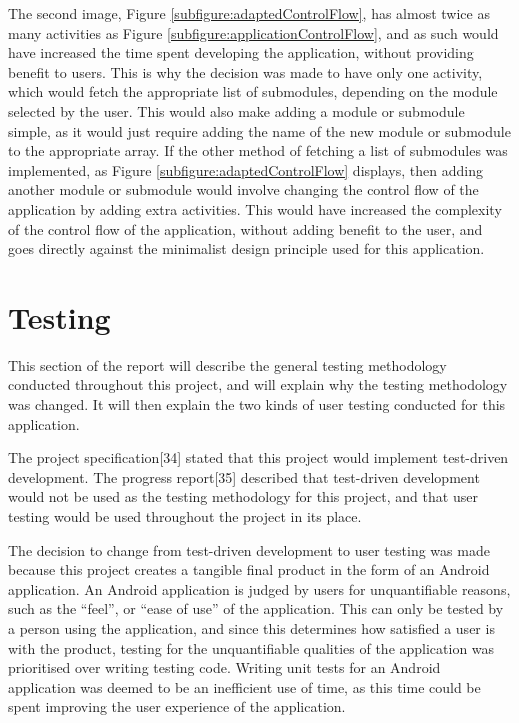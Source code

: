 \documentclass{article}
\begin{document}
The second image, Figure \ref{subfigure:adaptedControlFlow}, has almost twice as many activities as Figure \ref{subfigure:applicationControlFlow}, and as such would have increased the time spent developing the application, without providing benefit to users. This is why the decision was made to have only one activity, which would fetch the appropriate list of submodules, depending on the module selected by the user. This would also make adding a module or submodule simple, as it would just require adding the name of the new module or submodule to the appropriate array. If the other method of fetching a list of submodules was implemented, as Figure \ref{subfigure:adaptedControlFlow} displays, then adding another module or submodule would involve changing the control flow of the application by adding extra activities. This would have increased the complexity of the control flow of the application, without adding benefit to the user, and goes directly against the minimalist design principle used for this application. \par


\section{Testing}
\label{section:testing}

This section of the report will describe the general testing methodology conducted throughout this project, and will explain why the testing methodology was changed. It will then explain the two kinds of user testing conducted for this application. \par 

The project specification[34] stated that this project would implement test-driven development. The progress report[35] described that test-driven development would not be used as the testing methodology for this project, and that user testing would be used throughout the project in its place. \par

The decision to change from test-driven development to user testing was made because this project creates a tangible final product in the form of an Android application. An Android application is judged by users for unquantifiable reasons, such as the ``feel'', or ``ease of use'' of the application. This can only be tested by a person using the application, and since this determines how satisfied a user is with the product, testing for the unquantifiable qualities of the application was prioritised over writing testing code. Writing unit tests for an Android application was deemed to be an inefficient use of time, as this time could be spent improving the user experience of the application. \par
\end{document}

